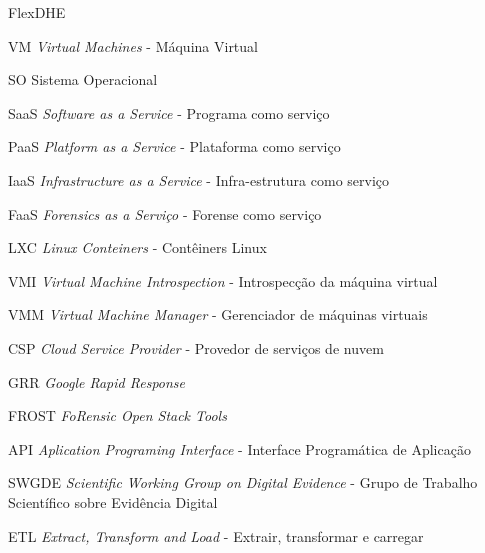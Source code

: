 \documentclass[a4paper,capchap,espacoduplo,normaltoc]{abntepusp-en}
\newcommand{\hash}{\mathcal{H}}
\newcommand{\bigO}{\mathcal{O}}
\begin{document}
\begin{listofabbrv}{FlexDHE}
    \item [VM] \textit{Virtual Machines} - Máquina Virtual
    \item [SO] Sistema Operacional
    \item [SaaS] \textit{Software as a Service} - Programa como serviço
    \item [PaaS] \textit{Platform as a Service} - Plataforma como serviço
    \item [IaaS] \textit{Infrastructure as a Service} - Infra-estrutura como serviço
    \item [FaaS] \textit{Forensics as a Serviço} - Forense como serviço
    \item [LXC] \textit{Linux Conteiners} - Contêiners Linux
    \item [VMI] \textit{Virtual Machine Introspection} - Introspecção da máquina virtual
    \item [VMM] \textit{Virtual Machine Manager} - Gerenciador de máquinas virtuais
    \item [CSP] \textit{Cloud Service Provider} - Provedor de serviços de nuvem
    \item [GRR] \textit{Google Rapid Response}
    \item [FROST] \textit{FoRensic Open Stack Tools} 
    \item [API] \textit{Aplication Programing Interface} - Interface Programática de Aplicação
    \item [SWGDE] \textit{Scientific Working Group on Digital Evidence} - Grupo de Trabalho Scientífico sobre Evidência Digital
    \item [ETL] \textit{Extract, Transform and Load} - Extrair, transformar e carregar
\end{listofabbrv}



\tableofcontents









\appendix

%
\end{document}
